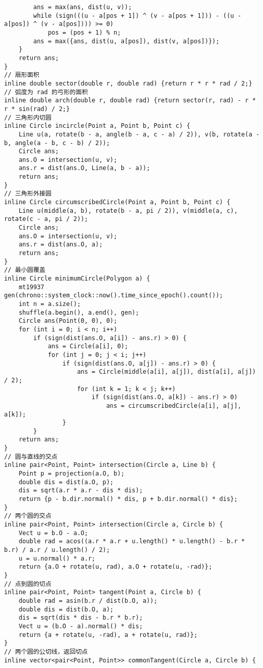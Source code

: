 \begin{verbatim}
        ans = max(ans, dist(u, v));
        while (sign(((u - a[pos + 1]) ^ (v - a[pos + 1])) - ((u - a[pos]) ^ (v - a[pos]))) >= 0)
            pos = (pos + 1) % n;
        ans = max({ans, dist(u, a[pos]), dist(v, a[pos])});
    }
    return ans;
}
// 扇形面积
inline double sector(double r, double rad) {return r * r * rad / 2;}
// 弧度为 rad 的弓形的面积
inline double arch(double r, double rad) {return sector(r, rad) - r * r * sin(rad) / 2;}
// 三角形内切圆
inline Circle incircle(Point a, Point b, Point c) {
    Line u(a, rotate(b - a, angle(b - a, c - a) / 2)), v(b, rotate(a - b, angle(a - b, c - b) / 2));
    Circle ans;
    ans.O = intersection(u, v);
    ans.r = dist(ans.O, Line(a, b - a));
    return ans;
}
// 三角形外接圆
inline Circle circumscribedCircle(Point a, Point b, Point c) {
    Line u(middle(a, b), rotate(b - a, pi / 2)), v(middle(a, c), rotate(c - a, pi / 2));
    Circle ans;
    ans.O = intersection(u, v);
    ans.r = dist(ans.O, a);
    return ans;
}
// 最小圆覆盖
inline Circle minimumCircle(Polygon a) {
    mt19937 gen(chrono::system_clock::now().time_since_epoch().count());
    int n = a.size();
    shuffle(a.begin(), a.end(), gen);
    Circle ans(Point(0, 0), 0);
    for (int i = 0; i < n; i++)
        if (sign(dist(ans.O, a[i]) - ans.r) > 0) {
            ans = Circle(a[i], 0);
            for (int j = 0; j < i; j++)
                if (sign(dist(ans.O, a[j]) - ans.r) > 0) {
                    ans = Circle(middle(a[i], a[j]), dist(a[i], a[j]) / 2);
                    for (int k = 1; k < j; k++)
                        if (sign(dist(ans.O, a[k]) - ans.r) > 0)
                            ans = circumscribedCircle(a[i], a[j], a[k]);
                }
        }
    return ans;
}
// 圆与直线的交点
inline pair<Point, Point> intersection(Circle a, Line b) {
    Point p = projection(a.O, b);
    double dis = dist(a.O, p);
    dis = sqrt(a.r * a.r - dis * dis);
    return {p - b.dir.normal() * dis, p + b.dir.normal() * dis};
}
// 两个圆的交点
inline pair<Point, Point> intersection(Circle a, Circle b) {
    Vect u = b.O - a.O;
    double rad = acos((a.r * a.r + u.length() * u.length() - b.r * b.r) / a.r / u.length() / 2);
    u = u.normal() * a.r;
    return {a.O + rotate(u, rad), a.O + rotate(u, -rad)};
}
// 点到圆的切点
inline pair<Point, Point> tangent(Point a, Circle b) {
    double rad = asin(b.r / dist(b.O, a));
    double dis = dist(b.O, a);
    dis = sqrt(dis * dis - b.r * b.r);
    Vect u = (b.O - a).normal() * dis;
    return {a + rotate(u, -rad), a + rotate(u, rad)};
}
// 两个圆的公切线，返回切点
inline vector<pair<Point, Point>> commonTangent(Circle a, Circle b) {

\end{verbatim}
